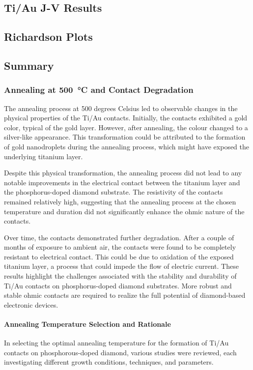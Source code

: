 \subsection{Ti/Au J-V Results}
\subsection{Richardson Plots}
\subsection{Summary}



\subsubsection{Annealing at \SI{500}{\celsius} and Contact Degradation}
\label{subsubsec:annealing}
The annealing process at 500 degrees Celsius led to observable changes in the physical properties of the Ti/Au contacts. Initially, the contacts exhibited a gold color, typical of the gold layer. However, after annealing, the colour changed to a silver-like appearance. This transformation could be attributed to the formation of gold nanodroplets during the annealing process, which might have exposed the underlying titanium layer.

Despite this physical transformation, the annealing process did not lead to any notable improvements in the electrical contact between the titanium layer and the phosphorus-doped diamond substrate. The resistivity of the contacts remained relatively high, suggesting that the annealing process at the chosen temperature and duration did not significantly enhance the ohmic nature of the contacts.

Over time, the contacts demonstrated further degradation. After a couple of months of exposure to ambient air, the contacts were found to be completely resistant to electrical contact. This could be due to oxidation of the exposed titanium layer, a process that could impede the flow of electric current. These results highlight the challenges associated with the stability and durability of Ti/Au contacts on phosphorus-doped diamond substrates. More robust and stable ohmic contacts are required to realize the full potential of diamond-based electronic devices.

\paragraph{Annealing Temperature Selection and Rationale}
In selecting the optimal annealing temperature for the formation of Ti/Au contacts on phosphorous-doped diamond, various studies were reviewed, each investigating different growth conditions, techniques, and parameters.

